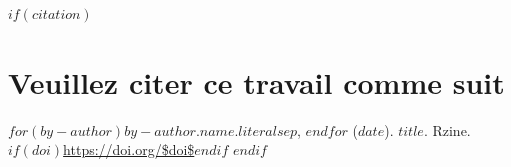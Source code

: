 \clearpage

$if(citation)$
\section*{Veuillez citer ce travail comme suit}

$for(by-author)$$by-author.name.literal$$sep$, $endfor$ ($date$). \textit{$title$}. Rzine.
$if(doi)$\url{https://doi.org/$doi$}$endif$
$endif$